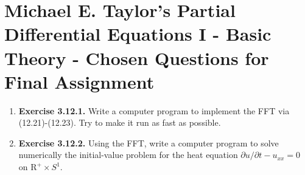 \documentclass[11pt]{article}
\begin{document}
\pagestyle{fancy}
\section*{Michael E. Taylor's Partial Differential Equations I - Basic Theory - Chosen Questions for Final Assignment}
\begin{enumerate}[1.]
	\item{\textbf{Exercise 3.12.1.}} Write a computer program to implement the FFT via (12.21)-(12.23). Try to make it run as fast as possible.
	\item{\textbf{Exercise 3.12.2.}} Using the FFT, write a computer program to solve numerically the initial-value problem for the heat
		equation $\partial u / \partial t - u_{xx} = 0$ on $\mathrm{R}^+ \times S^1$.
\end{enumerate}
\end{document}
